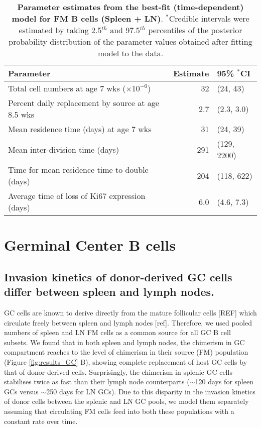 \documentclass[11pt]{article}
\begin{document}
	\vspace{1cm}
	
	
	\begin{table}[h!]
		\begin{center}
			\renewcommand{\arraystretch}{1.25}
			\begin{tabular}{ l r l } 
				\toprule 
				\textbf{Parameter}  &  {\small Estimate}  &  {\small 95\%  $^{\ast}$CI} \\ 
				\toprule
				Total cell numbers at age 7 wks ($\times 10^{-6}$)      & 32       &  (24, 43)  \\ 
				Percent daily replacement by source at age 8.5 wks      & 2.7      &  (2.3, 3.0)  \\
				Mean residence time (days) at age 7 wks                 & 31       &  (24, 39)  \\ 
				Mean inter-division time (days)                         & 291      &  (129, 2200)  \\
				Time for mean residence time to double (days)           & 204      &  (118, 622)  \\
				Average time of loss of Ki67 expression (days)          & 6.0      &  (4.6, 7.3)  \\
				\hline
				\toprule 
			\end{tabular}
		\end{center}
		\caption{\small \textbf{Parameter estimates from the best-fit (time-dependent) model for FM B cells (Spleen + LN)}. $^{\ast}$Credible intervals were estimated by taking 2.5$^{th}$ and 97.5$^{th}$ percentiles of the posterior probability distribution of the parameter values obtained after fitting model to the data.}
		\label{tab:FM-parestm}
	\end{table} 
	
\clearpage
	
\section*{Germinal Center B cells}

\subsection*{Invasion kinetics of donor-derived GC cells differ between spleen and lymph nodes.}
GC cells are known to derive directly from the mature follicular cells [REF] which circulate freely between spleen and lymph nodes [ref].
Therefore, we used pooled numbers of spleen and LN FM cells as a common source for all GC B cell subsets.
We found that in both spleen and lymph nodes, the chimerism in GC compartment reaches to the level of chimerism in their source (FM) population (Figure \ref{fig:results_GC} B), showing complete replacement of host GC cells by that of donor-derived cells. 
Surprisingly, the chimerism in splenic GC cells stabilises twice as fast than their lymph node counterparts ($\sim$120 days for spleen GCs versus $\sim$250 days for LN GCs). 
Due to this  disparity in the invasion kinetics of donor cells between the splenic and LN GC pools, we model them separately assuming that circulating FM cells feed into both these populations with a constant rate over time. 
\end{document}

